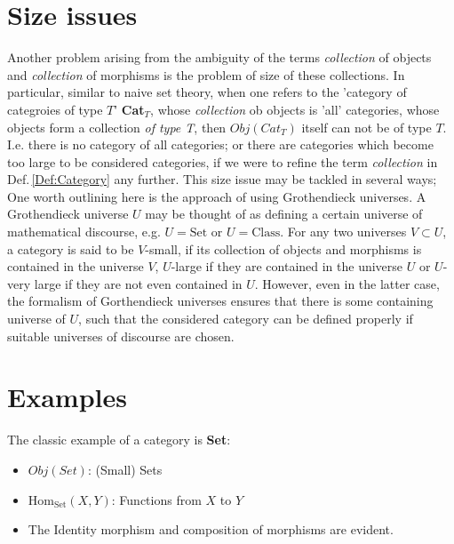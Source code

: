\documentclass{article}
\theoremstyle{definition}
\begin{document}
\section{Size issues}
Another problem arising from the ambiguity of the terms \textit{collection} of objects and \textit{collection} of morphisms is the problem of size of these collections. In particular, similar to naive set theory, when one refers to the 'category of categroies of type $T$' \textbf{Cat}$_T$, whose \textit{collection} ob objects is 'all' categories, whose objects form a collection \textit{of type T}, then $Obj(Cat_T)$ itself can not be of type $T$. I.e. there is no category of all categories; or there are categories which become too large to be considered categories, if we were to refine the term \textit{collection} in Def.\,\ref{Def:Category} any further. This size issue may be tackled in several ways; One worth outlining here is the approach of using Grothendieck universes. A Grothendieck universe $U$ may be thought of as defining a certain universe of mathematical discourse, e.g. $U=\text{Set}$ or $U=\text{Class}$.
For any two universes $V \subset U$, a category is said to be $V$-small, if its collection of objects and morphisms is contained in the universe $V$, $U$-large if they are contained in the universe $U$ or $U$-very large if they are not even contained in $U$.
However, even in the latter case, the formalism of Gorthendieck universes ensures that there is some containing universe of $U$, such that the considered category can be defined properly if suitable universes of discourse are chosen. 

\section{Examples}

The classic example of a category is \textbf{Set}:
\begin{itemize}
    \item $Obj(Set)$: (Small) Sets
    \item $\text{Hom}_{\text{Set}}(X,Y)$: Functions from $X$ to $Y$
    \item The Identity morphism and composition of morphisms are evident. 
\end{itemize}
\end{document}
